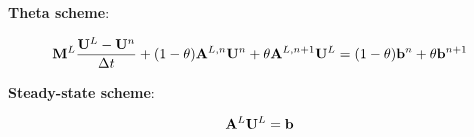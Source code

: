 \begin{center}{\textbf{Theta scheme}:}\end{center}
\begin{equation}\label{eq:low_theta}
  \lumpedmassmatrix\frac{\lowordersolution-\solutionvector^\timeindex}
  {\timestepsize}
  + (1-\theta)\loworderssmatrix[\timeindex]\solutionvector^\timeindex
  + \theta\loworderssmatrix[\timeindex+1]\lowordersolution
  = (1-\theta)\ssrhs^\timeindex + \theta\ssrhs^{\timeindex+1}
\end{equation}
\begin{center}{\textbf{Steady-state scheme}:}\end{center}
\begin{equation}\label{eq:low_ss}
   \loworderssmatrix\lowordersolution = \ssrhs
\end{equation}
